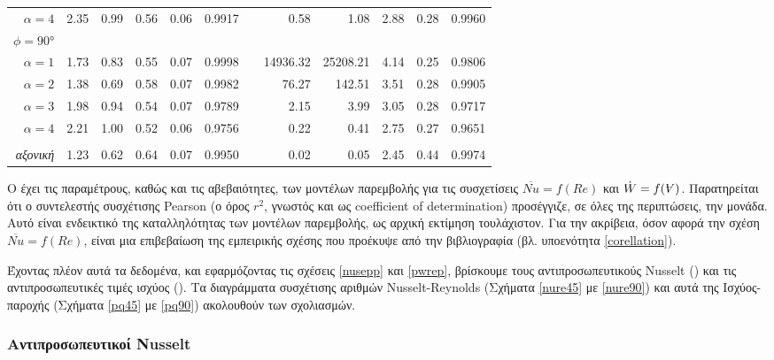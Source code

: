 \begin{table*}[!htbp]
\begin{adjustbox}{width=\textwidth}
\begin{tabular}{@{}rrrrrrcrrrrr@{}}
$\alpha = 4$ & 2.35 &  0.99 &  0.56 &  0.06 & 0.9917 &&  0.58 &  1.08 &  2.88 &  0.28 & 0.9960 \\
$\phi=\ang{90}$\\
$\alpha = 1$ & 1.73 &  0.83 &  0.55 &  0.07 & 0.9998 && 14936.32 & 25208.21 &  4.14 &  0.25 & 0.9806 \\
$\alpha = 2$ & 1.38 &  0.69 &  0.58 &  0.07 & 0.9982 && 76.27 & 142.51 &  3.51 &  0.28 & 0.9905 \\
$\alpha = 3$ & 1.98 &  0.94 &  0.54 &  0.07 & 0.9789 &&  2.15 &  3.99 &  3.05 &  0.28 & 0.9717 \\
$\alpha = 4$ & 2.21 &  1.00 &  0.52 &  0.06 & 0.9756 &&  0.22 &  0.41 &  2.75 &  0.27 & 0.9651 \\
&\\
\textit{αξονική} & 1.23 &  0.62 &  0.64 &  0.07 & 0.9950 &&  0.02 &  0.05 &  2.45 &  0.44 & 0.9974\\ 
\bottomrule
\end{tabular}
\end{adjustbox}
\end{table*}

Ο  έχει τις παραμέτρους, καθώς και τις αβεβαιότητες, των μοντέλων παρεμβολής για τις συσχετίσεις $\overline{Nu} = f(Re)$ και $\dot{W} = f(\volume)$. Παρατηρείται ότι ο συντελεστής συσχέτισης Pearson (ο όρος $r^2$, γνωστός και ως coefficient of determination) \cite{1987_Kendall_BOOK} προσέγγιζε, σε όλες της περιπτώσεις, την μονάδα. Αυτό είναι ενδεικτικό της καταλληλότητας των μοντέλων παρεμβολής, ως αρχική εκτίμηση τουλάχιστον. Για την ακρίβεια, όσον αφορά την σχέση $\overline{Nu} = f(Re)$, είναι μια επιβεβαίωση της εμπειρικής σχέσης που προέκυψε από την βιβλιογραφία (βλ. υποενότητα \ref{corellation}). 

Έχοντας πλέον αυτά τα δεδομένα, και εφαρμόζοντας τις σχέσεις \ref{nusepp} και \ref{pwrep}, βρίσκουμε τους αντιπροσωπευτικούς Nusselt () και τις αντιπροσωπευτικές τιμές ισχύος (). Τα διαγράμματα συσχέτισης αριθμών Nusselt-Reynolds (Σχήματα \ref{nure45} με \ref{nure90}) και αυτά της Ισχύος-παροχής (Σχήματα \ref{pq45} με \ref{pq90}) ακολουθούν των σχολιασμών.

\subsubsection{Αντιπροσωπευτικοί Nusselt}

